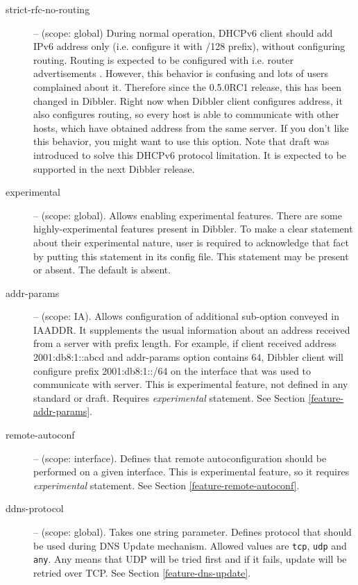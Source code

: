 \begin{description}
 \item[strict-rfc-no-routing] -- (scope: global) During normal
  operation, DHCPv6 client should add IPv6 address only
  (i.e. configure it with /128 prefix), without configuring routing.
  Routing is expected to be configured with i.e. router
  advertisements \cite{rfc4861}. However, this behavior is confusing
  and lots of users complained about it. Therefore since the 0.5.0RC1
  release, this has been changed in Dibbler. Right now when Dibbler
  client configures address, it also configures routing, so every host
  is able to communicate with other hosts, which have obtained address
  from the same server. If you don't like this behavior, you might
  want to use this option. Note that draft \cite{draft-route-option} was
  introduced to solve this DHCPv6 protocol limitation. It is expected
  to be supported in the next Dibbler release.

\item[experimental] -- (scope: global). Allows enabling experimental
features. There are some highly-experimental features present in
Dibbler. To make a clear statement about their experimental nature,
user is required to acknowledge that fact by putting this statement in
its config file. This statement may be present or absent. The default
is absent.

\item[addr-params] -- (scope: IA). Allows configuration of additional
sub-option conveyed in IAADDR. It supplements the usual information
about an address received from a server with prefix length. For
example, if client received address 2001:db8:1::abcd and addr-params
option contains 64, Dibbler client will configure prefix
2001:db8:1::/64 on the interface that was used to communicate with
server. This is experimental feature, not defined in any standard or
draft. Requires \emph{experimental} statement. See
Section \ref{feature-addr-params}.

\item[remote-autoconf] -- (scope: interface). Defines that remote
autoconfiguration should be performed on a given interface. This is
experimental feature, so it requires \emph{experimental}
statement. See Section \ref{feature-remote-autoconf}.

\item[ddns-protocol] -- (scope: global). Takes one string
parameter. Defines protocol that should be used during DNS Update
mechanism. Allowed values are \verb+tcp+, \verb+udp+ and \verb+any+.
Any means that UDP will be tried first and if it fails, update will be
retried over TCP. See Section \ref{feature-dns-update}.


\end{description}
